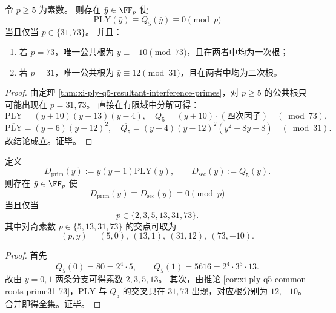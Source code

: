 \begin{corollary}\label{cor:xi-ply-q5-common-roots-prime31-73}
令 \(p\ge 5\) 为素数。
则存在 \(\bar y\in\FF_p\) 使
\[
\mathrm{PLY}(\bar y)\equiv Q_5(\bar y)\equiv 0\pmod p
\]
当且仅当 \(p\in\{31,73\}\)。
并且：
\begin{enumerate}
  \item 若 \(p=73\)，唯一公共根为 \(\bar y\equiv -10\pmod{73}\)，且在两者中均为一次根；
  \item 若 \(p=31\)，唯一公共根为 \(\bar y\equiv 12\pmod{31}\)，且在两者中均为二次根。
\end{enumerate}
\end{corollary}
\begin{proof}
由定理 \ref{thm:xi-ply-q5-resultant-interference-primes}，对 \(p\ge 5\) 的公共根只可能出现在 \(p=31,73\)。
直接在有限域中分解可得：
\[
\overline{\mathrm{PLY}}=(y+10)(y+13)(y-4),\quad
\overline{Q_5}=(y+10)\cdot(\text{四次因子})\quad(\bmod 73),
\]
\[
\overline{\mathrm{PLY}}=(y-6)(y-12)^2,\quad
\overline{Q_5}=(y-4)(y-12)^2(y^2+8y-8)\quad(\bmod 31).
\]
故结论成立。证毕。
\end{proof}

\begin{theorem}[二级退化除子与主分支除子的交叉素数全集]\label{thm:xi-dprim-dsec-intersection-primes}
定义
\[
D_{\mathrm{prim}}(y):=y(y-1)\mathrm{PLY}(y),
\qquad
D_{\mathrm{sec}}(y):=Q_5(y).
\]
则存在 \(\bar y\in\FF_p\) 使
\[
D_{\mathrm{prim}}(\bar y)\equiv D_{\mathrm{sec}}(\bar y)\equiv 0\pmod p
\]
当且仅当
\[
p\in\{2,3,5,13,31,73\}.
\]
其中对奇素数 \(p\in\{5,13,31,73\}\) 的交点可取为
\[
(p,\bar y)=(5,0),\ (13,1),\ (31,12),\ (73,-10).
\]
\end{theorem}
\begin{proof}
首先
\[
Q_5(0)=80=2^4\cdot 5,\qquad
Q_5(1)=5616=2^4\cdot 3^3\cdot 13.
\]
故由 \(y=0,1\) 两条分支可得素数 \(2,3,5,13\)。
其次，由推论 \ref{cor:xi-ply-q5-common-roots-prime31-73}，\(\mathrm{PLY}\) 与 \(Q_5\) 的交叉只在 \(31,73\) 出现，对应根分别为 \(12,-10\)。
合并即得全集。证毕。
\end{proof}

